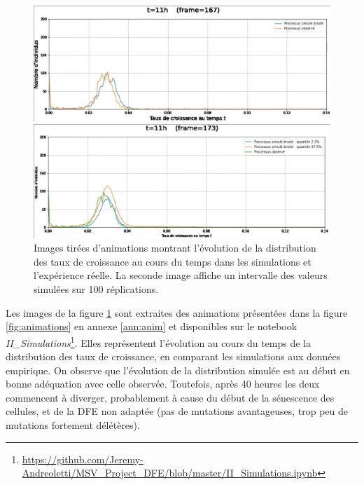 \documentclass[12pt]{article}
\begin{document}
\begin{figure}[h]
  \begin{center}
    \vspace{3mm}
    \includegraphics[scale=0.25]{img/GrowthRates_noisySimulations_VS_observations.png}

    \includegraphics[scale=0.25]{img/GrowthRates_noisySimulationsInterval_VS_observations.png}
  \end{center} 
  \caption{\label{fig:ss_animations}Images tirées d'animations montrant l'évolution de la distribution des taux de croissance au cours du temps dans les simulations et l'expérience réelle. La seconde image affiche un intervalle des valeurs simulées sur 100 réplications.}
\end{figure}

Les images de la figure \ref{fig:ss_animations} sont extraites des animations présentées dans la figure \ref{fig:animations} en annexe \ref{ann:anim} et disponibles sur le notebook \emph{II\_Simulations}\footnote{\url{https://github.com/Jeremy-Andreoletti/MSV_Project_DFE/blob/master/II_Simulations.ipynb}}. Elles représentent l'évolution au cours du temps de la distribution des taux de croissance, en comparant les simulations aux données empirique. On observe que l'évolution de la distribution simulée est au début en bonne adéquation avec celle observée. Toutefois, après 40 heures les deux commencent à diverger, probablement à cause du début de la sénescence des cellules, et de la DFE non adaptée (pas de mutations avantageuses, trop peu de mutations fortement délétères).
\end{document}
